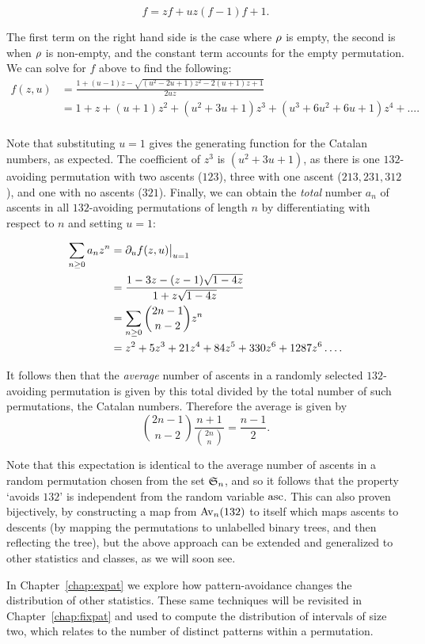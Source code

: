     $$ f = zf + uz(f - 1) f + 1.$$

    The first term on the right hand side is the case where $\ro$ is empty, the
    second is when $\ro$ is non-empty, and the constant term accounts for the
    empty permutation. We can solve for $f$ above to find the following:
    $$ \begin{aligned}
    f(z,u) &= \frac{1 + (u-1)z - \sqrt{(u^2 - 2u + 1)z^2 - 2(u+1)z + 1}}{2uz} \\
      &= 1 + z + (u+1)z^2 + (u^2 + 3u + 1)z^3 + (u^3 + 6u^2 + 6u + 1)z^4 +
      \dots. \\
      \end{aligned} $$

    Note that substituting $u=1$ gives the generating function for the Catalan
    numbers, as expected. The coefficient of $z^3$ is $(u^2 + 3u + 1)$, as
    there is one $132$-avoiding permutation with two ascents ($123$), three
    with one ascent ($213, 231, 312$), and one with no ascents ($321$).
    Finally, we can obtain the \emph{total} number $a_n$ of ascents in all
    $132$-avoiding permutations of length $n$ by differentiating with respect to $n$ and
    setting $u=1$:

    $$ \begin{aligned} 
       \sum_{n \geq 0} a_n z^n  &= \partial_u f(z,u) \uisone \\
       &= \frac{1 - 3z - (z - 1)\sqrt{1 - 4z}}{1 + z\sqrt{1 - 4z}} \\
       &= \sum_{n \geq 0} \binom{2n-1}{n-2} z^n \\
       &= z^2 + 5z^3 + 21z^4 + 84z^5 + 330 z^6 + 1287z^6 \dots .
    \end{aligned} $$
    
    It follows then that the \emph{average} number of ascents in a randomly
    selected $132$-avoiding permutation is given by this total divided by
    the total number of such permutations, the Catalan numbers. Therefore the
    average is given by 
    $$ \binom{2n-1}{n-2} \frac{n+1}{\binom{2n}{n}} = \frac{n-1}{2}.$$

    Note that this expectation is identical to the average number of ascents in
    a random permutation chosen from the set $\S_n$, and so it follows that
    the property `avoids $132$' is independent from the random variable $\asc$.
    This can also proven bijectively, by constructing a map from
    $\Av_n(132)$ to itself which maps ascents to descents (by mapping the
    permutations to unlabelled binary trees, and then reflecting the tree), but
    the above approach can be extended and generalized to other statistics and
    classes, as we will soon see. 
    
    In Chapter~\ref{chap:expat} we explore how pattern-avoidance changes the
    distribution of other statistics. These same techniques will be revisited
    in Chapter~\ref{chap:fixpat} and used to compute the distribution of
    intervals of size two, which relates to the number of distinct patterns
    within a permutation. 

  
    

    



